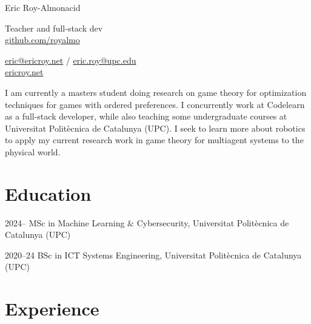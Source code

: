 \documentclass[a4paper]{report}
\newcommand{\namefont}[1]{{\Huge{#1}}}
\begin{document}
    \raggedright{}

    \namefont{Eric Roy-Almonacid}


    \vspace{1.7em}
    \begin{minipage}[t]{0.595\textwidth}
        Teacher and full-stack dev\\
        \href{https://github.com/royalmo}{github.com/royalmo}%
    \end{minipage}
    \begin{minipage}[t]{0.395\textwidth}
        \flushright{}
        \href{mailto:eric@ericroy.net}{eric@ericroy.net} / \href{mailto:eric.roy@upc.edu}{eric.roy@upc.edu} \\
        \href{https://ericroy.net}{ericroy.net}
    \end{minipage}

    \vspace{1.7em}
    
I am currently a masters student doing research on game theory for optimization techniques for games with ordered preferences. 
I concurrently work at Codelearn as a full-stack developer, while also teaching some undergraduate courses at Universitat Politècnica de Catalunya (UPC).
I seek to learn more about robotics to apply my current research work in game theory for multiagent systems to the physical world.

\vspace{-1em}
\section*{Education}

\begin{tablist}
\item[2024--] \tab{}MSc in Machine Learning \& Cybersecurity, Universitat Politècnica de Catalunya (UPC)
\item[2020--24] \tab{}BSc in ICT Systems Engineering, Universitat Politècnica de Catalunya (UPC)
\end{tablist}

\vspace{-1em}
\section*{Experience}
\end{document}
